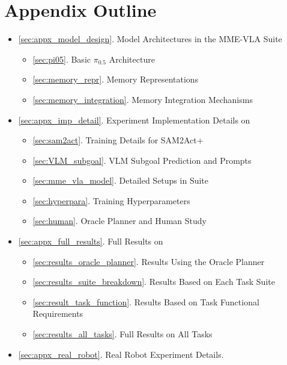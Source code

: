 

\section*{Appendix Outline}
\begin{itemize}

\item \ref{sec:appx_model_design}. Model Architectures in the MME-VLA Suite
    \begin{itemize}
      \item \ref{sec:pi05}. Basic $\pi_{0.5}$ Architecture
      \item \ref{sec:memory_repr}. Memory Representations
      \item \ref{sec:memory_integration}. Memory Integration Mechanisms
    \end{itemize}

\item \ref{sec:appx_imp_detail}. Experiment Implementation Details on \benchname
    \begin{itemize}
        \item \ref{sec:sam2act}. Training Details for SAM2Act+
        \item \ref{sec:VLM_subgoal}. VLM Subgoal Prediction and Prompts
        \item \ref{sec:mme_vla_model}. Detailed Setups in \modelname\xspace Suite
        \item \ref{sec:hyperpara}. Training Hyperparameters
        \item \ref{sec:human}. Oracle Planner and Human Study
    \end{itemize}
\item \ref{sec:appx_full_results}. Full Results on \benchname
    \begin{itemize}
        \item \ref{sec:results_oracle_planner}. Results Using the Oracle Planner 
        \item \ref{sec:results_suite_breakdown}. Results Based on Each Task Suite 
        \item \ref{sec:result_task_function}. Results Based on Task Functional Requirements
        \item \ref{sec:results_all_tasks}. Full Results on All Tasks
    \end{itemize}
\item \ref{sec:appx_real_robot}. Real Robot Experiment Details.


\end{itemize}

